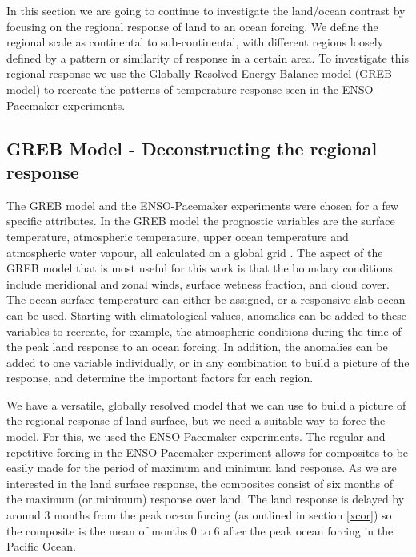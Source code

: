 In this section we are going to continue to investigate the land/ocean contrast 
by focusing on the regional response of land to an ocean forcing. We define the 
regional scale as continental to sub-continental, with different regions loosely 
defined by a pattern or similarity of response in a certain area. To investigate 
this regional response we use the Globally Resolved Energy Balance model (GREB 
model)  to recreate the patterns of temperature response seen in the 
ENSO-Pacemaker experiments.  

\subsection{GREB Model - Deconstructing the regional response}

The GREB model and the ENSO-Pacemaker experiments were chosen for a few specific 
attributes. In the GREB model the prognostic variables are the surface 
temperature, atmospheric temperature, upper ocean temperature and atmospheric 
water vapour, all calculated on a global grid \citep{Dommenget2011}. The aspect 
of the GREB model that is most useful for this work is that the boundary 
conditions include meridional and zonal winds, surface wetness fraction, and 
cloud cover.  The ocean surface temperature can either be assigned, or a 
responsive slab ocean can be used.  Starting with climatological values, 
anomalies can be added to these variables to recreate, for example, the 
atmospheric conditions during the time of the peak land response to an ocean 
forcing. In addition, the anomalies can be added to one variable individually, 
or in any combination to build a picture of the response, and determine the 
important factors for each region.

We have a versatile, globally resolved model that we can use to build a picture 
of the regional response of land surface, but we need a suitable way to force 
the model. For this, we used the ENSO-Pacemaker experiments. The regular and 
repetitive forcing in the ENSO-Pacemaker experiment allows for composites to be 
easily made for the period of maximum and minimum land response.  As we are 
interested in the land surface response, the composites consist of six months of 
the maximum (or minimum) response over land. The land response is delayed by 
around 3 months from the peak ocean forcing (as outlined in section \ref{xcor}) 
so the composite is the mean of months 0 to 6 after the peak ocean forcing in 
the Pacific Ocean. 

